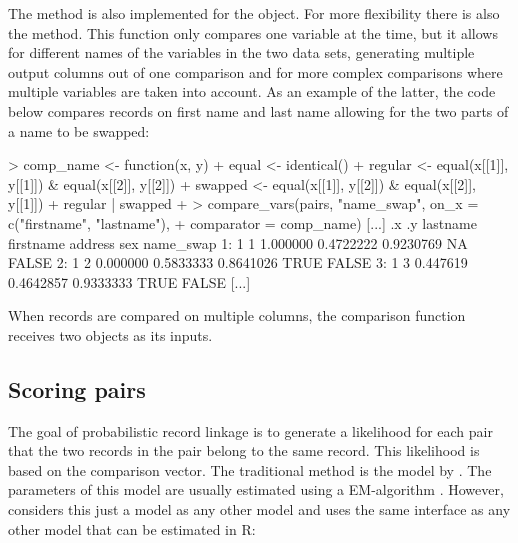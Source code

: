 The  method is also implemented for the  object. For more
flexibility there is also the  method. This function only compares one variable
at the time, but it allows for different names of the variables in the two data sets, generating
multiple output columns out of one comparison and for more complex comparisons where multiple
variables are taken into account. As an example of the latter, the code below compares records on
first name and last name allowing for the two parts of a name to be swapped:
\begin{example}
> comp_name <- function(x, y) {
+   equal <- identical()
+   regular <- equal(x[[1]], y[[1]]) & equal(x[[2]], y[[2]])
+   swapped <- equal(x[[1]], y[[2]]) & equal(x[[2]], y[[1]])
+   regular | swapped
+ }
> compare_vars(pairs, "name_swap", on_x = c("firstname", "lastname"),
+   comparator = comp_name)
[...]
    .x .y lastname firstname   address   sex name_swap
 1:  1  1 1.000000 0.4722222 0.9230769    NA     FALSE
 2:  1  2 0.000000 0.5833333 0.8641026  TRUE     FALSE
 3:  1  3 0.447619 0.4642857 0.9333333  TRUE     FALSE
[...]
\end{example}
When records are compared on multiple columns, the comparison function receives two
 objects as its inputs. 


\subsection{Scoring pairs}

The goal of probabilistic record linkage is to generate a likelihood for each pair that the two
records in the pair belong to the same record. This likelihood is based on the comparison vector.
The traditional method is the model by \citet{fs}. The parameters of this model are usually
estimated using a EM-algorithm \citep{em}. However,  considers this just a model as any
other model and uses the same interface as any other model that can be estimated in R:

